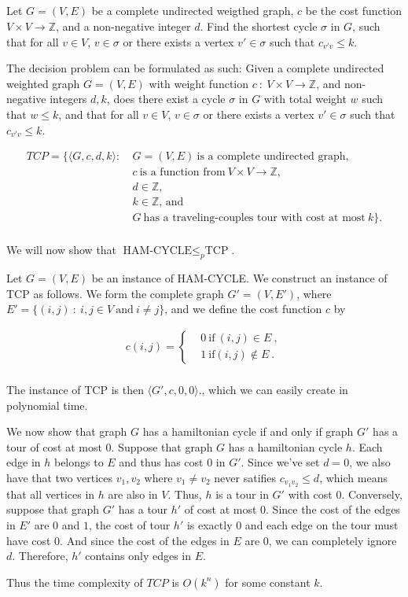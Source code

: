 \subsection{}

Let $G = (V,E)$ be a complete undirected weigthed graph, $c$ be the
cost function $V \times V \to \mathbb{Z}$, and a non-negative integer
$d$. Find the shortest cycle $\sigma$ in $G$, such that for all $v \in
V$, $v \in \sigma$ or there exists a vertex $v' \in \sigma$ such that
$c_{v'v} \leq k$.

The decision problem can be formulated as such: Given a complete
undirected weighted graph $G=(V,E)$ with weight function $c ~ : ~ V
\times V \to \mathbb{Z}$, and non-negative integers $d,k$, does there
exist a cycle $\sigma$ in $G$ with total weight $w$ such that $w \leq
k$, and that for all $v \in V$, $v \in \sigma$ or there exists a
vertex $v' \in \sigma$ such that $c_{v'v} \leq k$.

\begin{align*}
  TCP = \{ \langle G, c, d, k \rangle : ~ & G = (V,E) ~ \text{is a complete
    undirected graph}, \\
  & c ~ \text{is a function from} ~ V \times V \to \mathbb{Z}, \\
  & d \in \mathbb{Z}, \\ 
  & k \in \mathbb{Z} \textrm{, and} \\
  & G ~\text{has a traveling-couples tour with cost at most} ~ k\} .\\
\end{align*}

We will now show that $\text{HAM-CYCLE} \leq_p \text{TCP}$.

Let $G = (V,E)$ be an instance of HAM-CYCLE. We construct an instance
of TCP as follows. We form the complete graph $G' = (V,E')$, where $E'
= \{(i,j)~:~i,j\in V ~ \text{and}~ i \neq j \}$, and we define the
cost function $c$ by

\begin{align*}
  c(i,j) = \begin{cases} & 0 ~ \text{if} ~ (i, j) \in E~ , \\
    & 1 ~ \text{if} (i, j) \notin E~.\end{cases}\\
\end{align*}

The instance of TCP is then $\langle G', c, 0, 0 \rangle$., which we
can easily create in polynomial time.

We now show that graph $G$ has a hamiltonian cycle if and only if
graph $G'$ has a tour of cost at most $0$. Suppose that graph $G$ has
a hamiltonian cycle $h$. Each edge in $h$ belongs to $E$ and thus has
cost $0$ in $G'$. Since we've set $d=0$, we also have that two
vertices $v_1, v_2$ where $v_1 \neq v_2$ never satifies $c_{v_1v_2} \leq d$,
which means that all vertices in $h$ are also in $V$. Thus, $h$ is a
tour in $G'$ with cost $0$. Conversely, suppose that graph $G'$ has a
tour $h'$ of cost at most $0$. Since the cost of the edges in $E'$ are
$0$ and $1$, the cost of tour $h'$ is exactly $0$ and each edge on the
tour must have cost 0. And since the cost of the edges in $E$ are $0$,
we can completely ignore $d$. Therefore, $h'$ contains only edges in
$E$.

Thus the time complexity of $TCP$ is $O(k^n)$ for some constant $k$.
